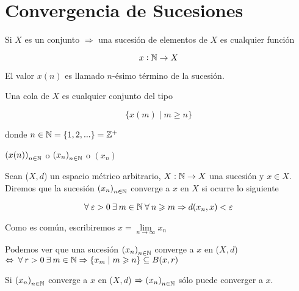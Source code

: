 \section{Convergencia de Sucesiones}

\begin{definition}[Sucesiones] \label{defsuc}
    Si $X$ es un conjunto $\Rightarrow$ una sucesión de elementos de $X$ es cualquier función

    $$x : \mathbb{N} \to X$$

    El valor $x(n)$ es llamado $n$-ésimo término de la sucesión.

    Una cola de $X$ es cualquier conjunto del tipo

    $$ \{ x(m) \mid m \geqslant n \}$$

    donde $n \in \mathbb{N} = \{ 1,2, ... \} = \mathbb{Z}^+$
\end{definition}

\begin{notation}
   $ {(x(n))}_{n \in \mathbb{N}}$ o $ {(x_n)}_{n \in \mathbb{N}}$ o $(x_n)$
\end{notation}

\begin{definition}[Convergencia] \label{def2213}
    Sean ($X,d$) un espacio métrico arbitrario, $X : \mathbb{N} \to X$ una sucesión y $x \in X$. Diremos que la sucesión $ {(x_n)}_{n \in \mathbb{N}}$ converge a $x$ en $X$ si ocurre lo siguiente

    $$ \forall \: \varepsilon >0 \: \exists \: m \in \mathbb{N} \: \forall \: n \geqslant m \Rightarrow d(x_n,x) < \varepsilon $$

    Como es común, escribiremos $x = \lim\limits_{n \to \infty} x_n$
\end{definition}

\begin{remark}
    Podemos ver que una sucesión $ {(x_n)}_{n \in \mathbb{N}}$ converge a $x$ en ($X,d$) $\Leftrightarrow \: \forall \: r > 0 \: \exists \: m \in \mathbb{N} \Rightarrow \{ x_m \mid m \geqslant n \} \subseteq B(x,r)$
\end{remark}

\begin{theorem} \label{theom232} 
    Si ${(x_n)}_{n \in \mathbb{N}}$ converge a $x$ en ($X,d$) $\Rightarrow {(x_n)}_{n \in \mathbb{N}}$ sólo puede converger a $x$. 
\end{theorem}

